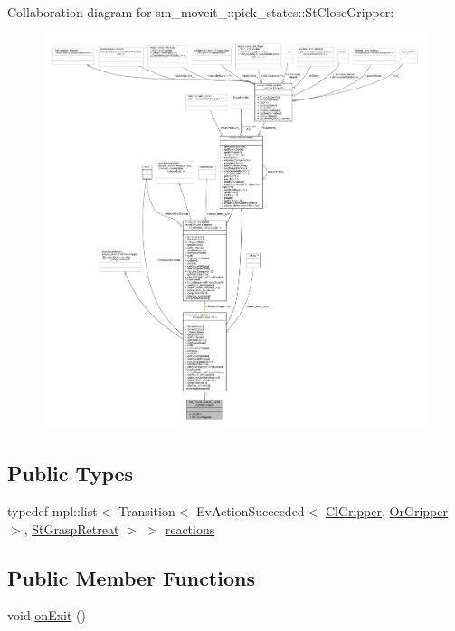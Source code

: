 Collaboration diagram for sm\+\_\+moveit\+\_\+:\+:pick\+\_\+states\+:\+:St\+Close\+Gripper\+:
\nopagebreak
\begin{figure}[H]
\begin{center}
\leavevmode
\includegraphics[width=350pt]{structsm__moveit__3_1_1pick__states_1_1StCloseGripper__coll__graph}
\end{center}
\end{figure}
\subsection*{Public Types}
\begin{DoxyCompactItemize}
\item 
typedef mpl\+::list$<$ Transition$<$ Ev\+Action\+Succeeded$<$ \hyperlink{classsm__moveit__3_1_1cl__gripper_1_1ClGripper}{Cl\+Gripper}, \hyperlink{classsm__moveit__3_1_1OrGripper}{Or\+Gripper} $>$, \hyperlink{structsm__moveit__3_1_1pick__states_1_1StGraspRetreat}{St\+Grasp\+Retreat} $>$ $>$ \hyperlink{structsm__moveit__3_1_1pick__states_1_1StCloseGripper_acee39b7b71a0c705d202a5b06339119b}{reactions}
\end{DoxyCompactItemize}
\subsection*{Public Member Functions}
\begin{DoxyCompactItemize}
\item 
void \hyperlink{structsm__moveit__3_1_1pick__states_1_1StCloseGripper_ace46820d7eac4f25e32f189539e41a04}{on\+Exit} ()
\end{DoxyCompactItemize}
